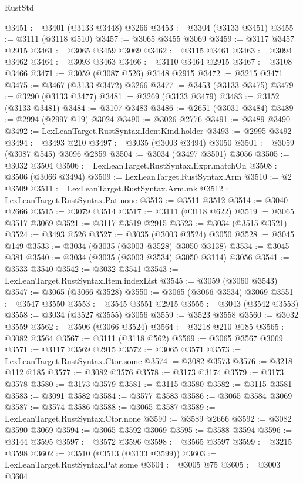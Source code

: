 \begin{lexlean}{RustStd}
\begin{coremodule}
@3451 := @3401 (@3133 @3448) @3266
@3453 := @3304 (@3133 @3451)
@3455 := @3111 (@3118 @510)
@3457 := @3065 @3455 @3069
@3459 := @3117 @3457 @2915
@3461 := @3065 @3459 @3069
@3462 := @3115 @3461
@3463 := @3094 @3462
@3464 := @3093 @3463
@3466 := @3110 @3464 @2915
@3467 := @3108 @3466
@3471 := @3059 (@3087 @526) @3148 @2915
@3472 := @3215 @3471
@3475 := @3467 (@3133 @3472) @3266
@3477 := @3453 (@3133 @3475)
@3479 := @3290 (@3133 @3477)
@3481 := @3269 (@3133 @3479)
@3483 := @3152 (@3133 @3481)
@3484 := @3107 @3483
@3486 := @2651 (@3031 @3484)
@3489 := @2994 (@2997 @19) @3024
@3490 := @3026 @2776
@3491 := @3489 @3490
@3492 := LexLeanTarget.RustSyntax.IdentKind.holder
@3493 := @2995 @3492
@3494 := @3493 @210
@3497 := @3035 (@3003 @3494) @3050
@3501 := @3059 (@3087 @545) @3096 @2859
@3504 := @3034 (@3497 @3501) @3056
@3505 := @3032 @3504
@3506 := LexLeanTarget.RustSyntax.Expr.matchOn
@3508 := @3506 (@3066 @3494)
@3509 := LexLeanTarget.RustSyntax.Arm
@3510 := @2 @3509
@3511 := LexLeanTarget.RustSyntax.Arm.mk
@3512 := LexLeanTarget.RustSyntax.Pat.none
@3513 := @3511 @3512
@3514 := @3040 @2666
@3515 := @3079 @3514
@3517 := @3111 (@3118 @622)
@3519 := @3065 @3517 @3069
@3521 := @3117 @3519 @2915
@3523 := @3034 (@3515 @3521)
@3524 := @3493 @526
@3527 := @3035 (@3003 @3524) @3050
@3528 := @3045 @149
@3533 := @3034 (@3035 (@3003 @3528) @3050 @3138)
@3534 := @3045 @381
@3540 := @3034 (@3035 (@3003 @3534) @3050 @3114) @3056
@3541 := @3533 @3540
@3542 := @3032 @3541
@3543 := LexLeanTarget.RustSyntax.Item.indexList
@3545 := @3059 (@3060 @3543)
@3547 := @3065 (@3066 @3528)
@3550 := @3065 (@3066 @3534) @3069
@3551 := @3547 @3550
@3553 := @3545 @3551 @2915
@3555 := @3043 (@3542 @3553)
@3558 := @3034 (@3527 @3555) @3056
@3559 := @3523 @3558
@3560 := @3032 @3559
@3562 := @3506 (@3066 @3524)
@3564 := @3218 @210 @185
@3565 := @3082 @3564
@3567 := @3111 (@3118 @562)
@3569 := @3065 @3567 @3069
@3571 := @3117 @3569 @2915
@3572 := @3065 @3571
@3573 := LexLeanTarget.RustSyntax.Ctor.some
@3574 := @3082 @3573
@3576 := @3218 @112 @185
@3577 := @3082 @3576
@3578 := @3173 @3174
@3579 := @3173 @3578
@3580 := @3173 @3579
@3581 := @3115 @3580
@3582 := @3115 @3581
@3583 := @3091 @3582
@3584 := @3577 @3583
@3586 := @3065 @3584 @3069
@3587 := @3574 @3586
@3588 := @3065 @3587
@3589 := LexLeanTarget.RustSyntax.Ctor.none
@3590 := @3589 @2666
@3592 := @3082 @3590 @3069
@3594 := @3065 @3592 @3069
@3595 := @3588 @3594
@3596 := @3144 @3595
@3597 := @3572 @3596
@3598 := @3565 @3597
@3599 := @3215 @3598
@3602 := @3510 (@3513 (@3133 @3599))
@3603 := LexLeanTarget.RustSyntax.Pat.some
@3604 := @3005 @75
@3605 := @3003 @3604

\end{coremodule}
\end{lexlean}
